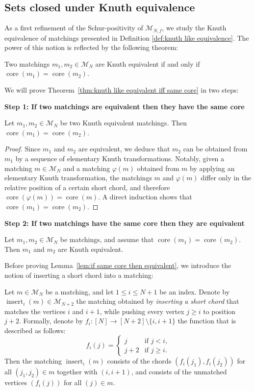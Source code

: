 \documentclass[ALCO]{cedram}
\makeatletter
\newcommand{\core}{\operatorname{core}}
\newcommand{\insrt}{\operatorname{insert}}
\newcommand{\M}{\mathcal{M}}
\newcommand{\proofstep}[1]{%
  \par%
  \addvspace{\medskipamount}%
  \textbf{#1\@addpunct{.}}\enspace\ignorespaces
}
\makeatother
\begin{document}
\subsection{Sets closed under Knuth equivalence}
As a first refinement of the Schur-positivity of $\M_{N,f}$, we study the Knuth equivalence of matchings presented in Definition \ref{def:knuth like equivalence}.
The power of this notion is reflected by the following theorem:
\begin{theorem}
\label{thm:knuth like equivalent iff same core}
    Two matchings $m_1, m_2 \in \M_N$ are Knuth equivalent if and only if $\core(m_1) = \core(m_2)$.
\end{theorem}

We will prove Theorem~\ref{thm:knuth like equivalent iff same core} in two steps:
\proofstep{Step 1: If two matchings are equivalent then they have the same core}
\begin{lemma}
    Let $m_1, m_2 \in \M_N$ be two Knuth equivalent matchings. Then $\core(m_1) = \core(m_2)$.
\end{lemma}
\begin{proof}
    Since $m_1$ and $m_2$ are equivalent, we deduce that $m_2$ can be obtained from $m_1$ by a sequence of elementary Knuth transformations. Notably, given a matching $m \in \M_N$ and a matching $\varphi(m)$ obtained from $m$ by applying an elementary Knuth transformation, the matchings $m$ and $\varphi(m)$ differ only in the relative position of a certain short chord, and therefore $\core(\varphi(m)) = \core(m)$. A direct induction shows that $\core(m_1) = \core(m_2)$.
\end{proof}

\proofstep{Step 2: If two matchings have the same core then they are equivalent}
\begin{lemma}
\label{lem:if same core then equivalent}
    Let $m_1, m_2 \in \M_N$ be matchings, and assume that $\core(m_1) = \core(m_2)$. Then $m_1$ and $m_2$ are Knuth equivalent.
\end{lemma}
Before proving Lemma~\ref{lem:if same core then equivalent}, we introduce the notion of inserting a short chord into a matching:
\begin{definition}
\label{def:insert short chord to matching}
    Let $m \in \M_N$ be a matching, and let $1 \le i \le N+1$ be an index. Denote by $\insrt_i(m) \in \M_{N+2}$ the matching obtained by \emph{inserting a short chord} that matches the vertices $i$ and $i+1$, while pushing every vertex $j \ge i$ to position $j+2$. Formally, denote by $f_i:[N] \to [N+2]\setminus\{i,i+1\}$ the function that is described as follows:
    \[
        f_i(j) = \begin{cases}
			j & \text{if $j < i$,}\\
            j+2 & \text{if $j \ge i$.}
		 \end{cases}
    \]
    Then the matching $\insrt_i(m)$ consists of the chords $(f_i(j_1),f_i(j_2))$ for all $(j_1,j_2) \in m$ together with $(i,i+1)$, and consists of the unmatched vertices $(f_i(j))$ for all $(j) \in m$.
\end{definition}
\end{document}
